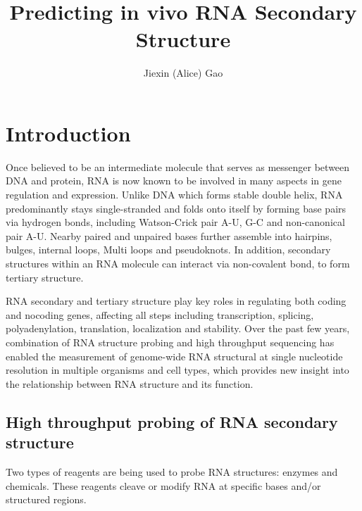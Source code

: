 \documentclass{proposal}
\author{Jiexin (Alice) Gao}
\title{Predicting in vivo RNA Secondary Structure}
\begin{document}
\begin{preliminary}

\maketitle

%
%
%

\tableofcontents

\end{preliminary}





\chapter{Introduction}




Once believed to be an intermediate molecule that serves as messenger between DNA and protein,
RNA is now known to be involved in many aspects in gene regulation and expression.
Unlike DNA which forms stable double helix, RNA predominantly stays single-stranded and folds onto itself by
forming base pairs via hydrogen bonds, including Watson-Crick pair A-U, G-C and non-canonical pair A-U.
Nearby paired and unpaired bases further assemble into
hairpins, bulges, internal loops, Multi loops and pseudoknots.
In addition, secondary structures within an RNA molecule can interact via non-covalent bond, to form tertiary structure.


RNA secondary and tertiary structure play key roles in regulating both coding and nocoding genes,
affecting all steps including transcription, splicing, polyadenylation, translation,
localization and stability\cite{wan2011understanding, mortimer2014insights, bevilacqua2016genome}.
Over the past few years, combination of RNA structure probing and high throughput sequencing has enabled
the measurement of genome-wide RNA structural at single nucleotide resolution in multiple organisms and cell types,
which provides new insight into the relationship between RNA structure and its function.

\section{High throughput probing of RNA secondary structure}

Two types of reagents are being used to probe RNA structures: enzymes and chemicals.
These reagents cleave or modify RNA at specific bases and/or structured regions.
\end{document}
